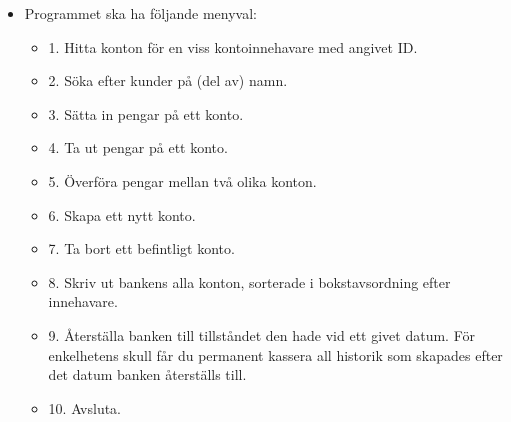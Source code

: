 \begin{itemize}
\item Programmet ska ha följande menyval:

\begin{itemize}
\item 1. Hitta konton för en viss kontoinnehavare med angivet ID.
\item 2. Söka efter kunder på (del av) namn.
\item 3. Sätta in pengar på ett konto.
\item 4. Ta ut pengar på ett konto.
\item 5. Överföra pengar mellan två olika konton.
\item 6. Skapa ett nytt konto.
\item 7. Ta bort ett befintligt konto.
\item 8. Skriv ut bankens alla konton, sorterade i bokstavsordning efter innehavare.
\item 9. Återställa banken till tillståndet den hade vid ett givet datum. För enkelhetens skull får du permanent kassera all historik som skapades efter det datum banken återställs till.
\item 10. Avsluta.
\end{itemize}


\end{itemize}
